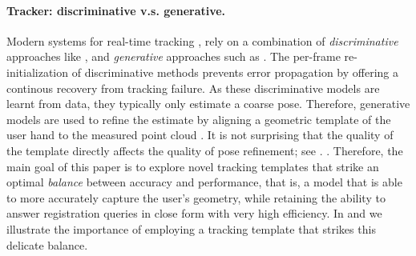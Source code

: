 \paragraph{Tracker: discriminative v.s. generative.}
Modern systems for real-time tracking \cite{sridhar2015fast,sharp2015accurate},  rely on a combination of \emph{discriminative} approaches like \cite{oberweger2015feedback}, and \emph{generative} approaches such as \cite{tagliasacchi2015robust}. The per-frame re-initialization of discriminative methods prevents error propagation by offering a continous recovery from tracking failure. As these discriminative models are learnt from data, they typically only estimate a coarse pose. Therefore, generative models are used to refine the estimate by aligning a geometric template of the user hand to the measured point cloud . It is not surprising that the quality of the template directly affects the quality of pose refinement; see . 
.
% 
Therefore, the main goal of this paper is to explore novel tracking templates that strike an optimal \emph{balance} between accuracy and performance, that is, a model that is able to more accurately capture the user's geometry, while retaining the ability to answer registration queries in close form with very high efficiency. In  and  we illustrate the importance of employing a tracking template that strikes this delicate balance.



